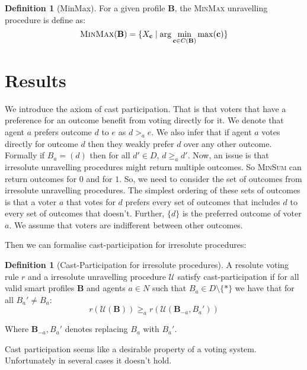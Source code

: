 \documentclass[11pt,a4paper, titlepage]{article}
\theoremstyle{definition}
\newtheorem{definition}[theorem]{Definition}
\begin{document}
\begin{definition}[MinMax]
    For a given profile $\mathbf{B}$, the \textsc{MinMax} unravelling procedure is define as:
    \[
        \textsc{MinMax}(\mathbf{B}) = \{X_{\mathbf{c}} \mid \mathrm{arg} \min_{\mathbf{c} \in C(\mathbf{B})} \max (\mathbf{c}) \}
    \]
\end{definition}



\newpage



\section{Results}

We introduce the axiom of cast participation. That is that voters that have a preference for an outcome benefit from voting directly for it. We denote that agent $a$ prefers outcome $d$ to $e$ as $d >_a e$. We also infer that if agent $a$ votes directly for outcome $d$ then they weakly prefer $d$ over any other outcome. Formally if $B_a = (d)$ then for all $d' \in D$, $d \geq_a d'$.
Now, an issue is that irresolute unravelling procedures might return multiple outcomes. So \textsc{MinSum} can return outcomes for $0$ and for $1$.
So, we need to consider the set of outcomes from irresolute unravelling procedures. The simplest ordering of these sets of outcomes is that a voter $a$ that votes for $d$ prefers every set of outcomes that includes $d$ to every set of outcomes that doesn't. Further, $\{d\}$ is the preferred outcome of voter $a$. We assume that voters are indifferent between other outcomes. 

Then we can formalise cast-participation for irresolute procedures:

\begin{definition}[Cast-Participation for irresolute procedures]
    A resolute voting rule $r$ and a irresolute unravelling procedure $\mathcal{U}$ satisfy cast-participation if for all valid smart profiles $\mathbf{B}$ and agents $a \in N$ such that $B_a \in D \setminus \{*\}$ we have that for all $B_a' \neq B_a$:
    \[
        r(\mathcal{U}(\mathbf{B})) \geq_a r(\mathcal{U}(\mathbf{B}_{-a}, B_a'))
    \]

    Where $\mathbf{B}_{-a}, B_a'$ denotes replacing $B_a$ with $B_a'$. 
\end{definition}

Cast participation seems like a desirable property of a voting system. Unfortunately in several cases it doesn't hold.
\end{document}
